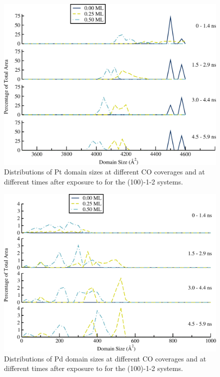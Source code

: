 \begin{figure}
\centering
  \includegraphics[width=\linewidth]{../figures/appD/ds_100_1Pt_2Pd_Pt.pdf}
  \caption{Distributions of Pt domain sizes at different CO coverages and at
different times after exposure to  for the (100)-1-2
systems.}
\label{fig:ds100Pt}
\end{figure}


\begin{figure}
\centering
  \includegraphics[width=\linewidth]{../figures/appD/ds_100_1Pt_2Pd_Pd.pdf}
  \caption{Distributions of Pd domain sizes at different CO coverages and at
different times after exposure to  for the (100)-1-2
systems.}
\label{fig:ds100Pd}
\end{figure}

